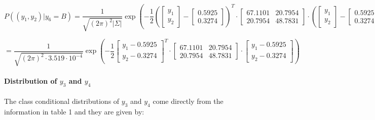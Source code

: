 \documentclass{article}
\begin{document}
\[
    P((y_1,y_2)|y_6=B) = \frac{1}{\sqrt{(2\pi)^2 |\Sigma|}} \exp \left( -\frac{1}{2} \left(\begin{bmatrix} y_1 \\ y_2 \end{bmatrix} - \begin{bmatrix} 0.5925 \\ 0.3274 \end{bmatrix}\right)^T \cdot \begin{bmatrix}
    67.1101 & 20.7954 \\
    20.7954 & 48.7831
  \end{bmatrix} \cdot \left(\begin{bmatrix} y_1 \\ y_2 \end{bmatrix} - \begin{bmatrix} 0.5925 \\ 0.3274 \end{bmatrix}\right) \right)
\]

\[
  = \frac{1}{\sqrt{(2\pi)^2 \cdot 3.519 \cdot 10^{-4}}} \exp \left( -\frac{1}{2} \left[ \begin{matrix} y_1 - 0.5925 \\ y_2 - 0.3274 \end{matrix} \right]^T \cdot \begin{bmatrix}
    67.1101 & 20.7954 \\
    20.7954 & 48.7831  
  \end{bmatrix} \cdot \left[ \begin{matrix} y_1 - 0.5925 \\ y_2 - 0.3274 \end{matrix} \right] \right)
\]





\paragraph{Distribution of $y_3$ and $y_4$}
\paragraph{}

The class conditional distributions of $y_3$ and $y_4$ come directly from the information in table 1 and they are given by:
\end{document}
